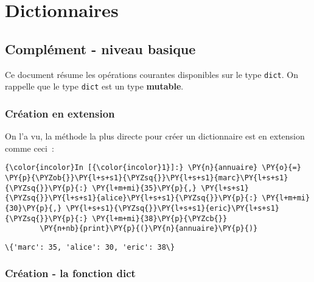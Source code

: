     
    
    
    

    

    \hypertarget{dictionnaires}{%
\section{Dictionnaires}\label{dictionnaires}}

    \hypertarget{compluxe9ment---niveau-basique}{%
\subsection{Complément - niveau
basique}\label{compluxe9ment---niveau-basique}}

    Ce document résume les opérations courantes disponibles sur le type
\texttt{dict}. On rappelle que le type \texttt{dict} est un type
\textbf{mutable}.

    \hypertarget{cruxe9ation-en-extension}{%
\subsubsection{Création en extension}\label{cruxe9ation-en-extension}}

    On l'a vu, la méthode la plus directe pour créer un dictionnaire est en
extension comme ceci~:

    \begin{Verbatim}[commandchars=\\\{\},frame=single,framerule=0.3mm,rulecolor=\color{cellframecolor}]
{\color{incolor}In [{\color{incolor}1}]:} \PY{n}{annuaire} \PY{o}{=} \PY{p}{\PYZob{}}\PY{l+s+s1}{\PYZsq{}}\PY{l+s+s1}{marc}\PY{l+s+s1}{\PYZsq{}}\PY{p}{:} \PY{l+m+mi}{35}\PY{p}{,} \PY{l+s+s1}{\PYZsq{}}\PY{l+s+s1}{alice}\PY{l+s+s1}{\PYZsq{}}\PY{p}{:} \PY{l+m+mi}{30}\PY{p}{,} \PY{l+s+s1}{\PYZsq{}}\PY{l+s+s1}{eric}\PY{l+s+s1}{\PYZsq{}}\PY{p}{:} \PY{l+m+mi}{38}\PY{p}{\PYZcb{}}
        \PY{n+nb}{print}\PY{p}{(}\PY{n}{annuaire}\PY{p}{)}
\end{Verbatim}


    \begin{Verbatim}[commandchars=\\\{\},frame=single,framerule=0.3mm,rulecolor=\color{cellframecolor}]
\{'marc': 35, 'alice': 30, 'eric': 38\}
\end{Verbatim}

    \hypertarget{cruxe9ation---la-fonction-dict}{%
\subsubsection{Création - la fonction
dict}\label{cruxe9ation---la-fonction-dict}}

